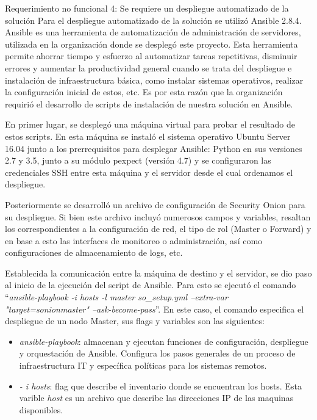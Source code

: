     \pagebreak
    \begin{section}{Requerimiento no funcional 4: Se requiere un despliegue automatizado de la solución}
    Para el despliegue automatizado de la solución se utilizó Ansible  2.8.4. Ansible es una herramienta de automatización de administración de servidores, utilizada en la organización donde se desplegó este proyecto. Esta herramienta permite ahorrar tiempo y esfuerzo al automatizar tareas repetitivas, disminuir errores y aumentar la productividad general cuando se trata del despliegue e instalación de infraestructura básica, como instalar sistemas operativos, realizar la configuración inicial de estos, etc. Es por esta razón que la organización requirió el desarrollo de scripts de instalación de nuestra solución en Ansible.\par
    En primer lugar, se desplegó una máquina virtual para probar el resultado de estos scripts. En esta máquina se instaló el sistema operativo Ubuntu Server 16.04 junto a los prerrequisitos para desplegar Ansible: Python en sus versiones 2.7 y 3.5, junto a su módulo pexpect (versión 4.7) y se configuraron las credenciales SSH entre esta máquina y el servidor desde el cual ordenamos el despliegue.\par
    Posteriormente se desarrolló un archivo de configuración de Security Onion para su despliegue. Si bien este archivo incluyó numerosos campos y variables, resaltan los correspondientes a la configuración de red, el tipo de rol (Master o Forward) y en base a esto las interfaces de monitoreo o administración, así como configuraciones de almacenamiento de logs, etc.\par
    Establecida la comunicación entre la máquina de destino y el servidor, se dio paso al inicio de la ejecución del script de Ansible. Para esto se ejecutó el comando “\textit{ansible-playbook -i hosts -l master so\_setup.yml --extra-var "target=sonionmaster"\hspace{1 mm} --ask-become-pass}”. En este caso, el comando especifica el despliegue de un nodo Master, sus flags y variables son las siguientes:
    \begin{itemize}
        \item \textit{ansible-playbook}: almacenan y ejecutan funciones de configuración, despliegue y orquestación de Ansible. Configura los pasos generales de un proceso de infraestructura IT y específica políticas para los sistemas remotos. 
        \item \textit{- i hosts}: flag que describe el inventario donde se encuentran los hosts. Esta varible \textit{host} es un archivo que describe las direcciones IP de las maquinas disponibles.

\end{itemize}
\end{section}
